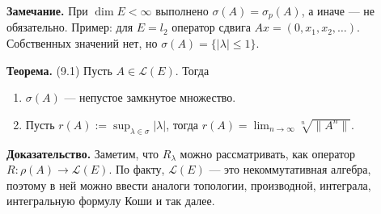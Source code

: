 \textbf{Замечание.} При $\dim E < \infty$ выполнено $\sigma(A) = \sigma_p(A)$, а иначе --- не обязательно.
Пример: для $E = l_2$ оператор сдвига $Ax = (0, x_1, x_2, \dots)$.
Собственных значений нет, но $\sigma(A) = \{|\lambda| \le 1\}$.

\label{th:9-1} \textbf{Теорема.} (9.1) Пусть $A \in \mathcal L(E)$.
Тогда
\begin{enumerate}
    \item $\sigma(A)$ --- непустое замкнутое множество.
    \item Пусть $r(A) := \sup_{\lambda \in \sigma} |\lambda|$, тогда $r(A) = \lim_{n \to \infty} \sqrt[n]{\|A^n\|}$.
\end{enumerate}

\textbf{Доказательство.} Заметим, что $R_\lambda$ можно рассматривать, как оператор $R: \rho(A) \to \mathcal L(E)$.
По факту, $\mathcal L(E)$ --- это некоммутативная алгебра, поэтому в ней можно ввести аналоги топологии, производной, интеграла, интегральную формулу Коши и так далее.

